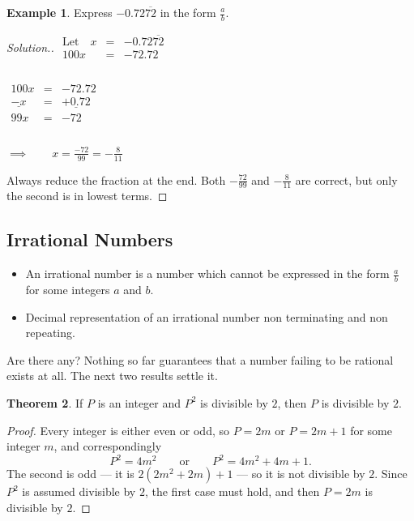 \documentclass[11pt,a4paper]{article}
\theoremstyle{definition}
\newtheorem{thm}{Theorem}[section]
\newtheorem{example}[thm]{Example}
\newenvironment{solution}
  {\renewcommand{\qedsymbol}{}\begin{proof}[\textit{Solution}.]}
  {\end{proof}}
\begin{document}
\begin{example}
Express $-0.72\overline{72}$ in the form $\frac{a}{b}$.
\end{example}

\begin{solution}
$
\begin{matrix}
\text{Let}\quad  x &= &-0.72\overline{72}\\
100x & = & -72.72\\
\end{matrix} 
$ \\\\


$
\begin{matrix}
100x & = & -72.72\\
\underline{-x} & = & \underline{+ 0.72}\\
99x & = & -72\\
\end{matrix}
$ \\\\

$\implies \qquad  x=\frac{-72}{99}=-\frac{8}{11}$

Always reduce the fraction at the end. Both $-\frac{72}{99}$ and $-\frac{8}{11}$
are correct, but only the second is in lowest terms.
\end{solution}

\subsection{Irrational Numbers}
\begin{itemize}
\item An irrational number is a number which cannot be expressed in the form $\frac{a}{b}$ for some integers $a$ and $b$.
\item Decimal representation of an irrational number non terminating and non repeating.
\end{itemize}

Are there any? Nothing so far guarantees that a number failing to be rational
exists at all. The next two results settle it.

\begin{thm}
\label{thm:evensquare}
If $P$ is an integer and $P^{2}$ is divisible by $2$, then $P$ is divisible by $2$.
\end{thm}

\begin{proof}
Every integer is either even or odd, so $P=2m$ or $P=2m+1$ for some integer $m$,
and correspondingly
$$P^{2}=4m^{2} \qquad \text{or}\qquad  P^{2}=4m^{2}+4m+1 .$$
The second is odd --- it is $2\left(2m^{2}+2m\right)+1$ --- so it is not divisible by
$2$. Since $P^{2}$ is assumed divisible by $2$, the first case must hold, and then
$P=2m$ is divisible by $2$.
\end{proof}
\end{document}
